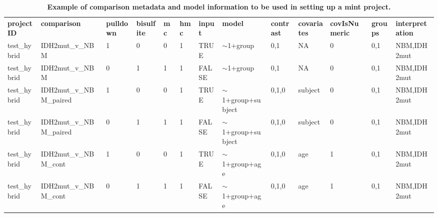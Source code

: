 \begin{sidewaystable}[!ht]
\centering
\tiny
\begin{tabular}{lllllllllllll}
\textbf{projectID} & \textbf{comparison}     & \textbf{pulldown} & \textbf{bisulfite} & \textbf{mc} & \textbf{hmc} & \textbf{input} & \textbf{model}        & \textbf{contrast} & \textbf{covariates} & \textbf{covIsNumeric} & \textbf{groups} & \textbf{interpretation} \\
test\_hybrid       & IDH2mut\_v\_NBM         & 1                 & 0                  & 0           & 1            & TRUE           & $\sim$1+group         & 0,1               & NA                  & 0                     & 0,1             & NBM,IDH2mut             \\
test\_hybrid       & IDH2mut\_v\_NBM         & 0                 & 1                  & 1           & 1            & FALSE          & $\sim$1+group         & 0,1               & NA                  & 0                     & 0,1             & NBM,IDH2mut             \\
test\_hybrid       & IDH2mut\_v\_NBM\_paired & 1                 & 0                  & 0           & 1            & TRUE           & $\sim$1+group+subject & 0,1,0             & subject             & 0                     & 0,1             & NBM,IDH2mut             \\
test\_hybrid       & IDH2mut\_v\_NBM\_paired & 0                 & 1                  & 1           & 1            & FALSE          & $\sim$1+group+subject & 0,1,0             & subject             & 0                     & 0,1             & NBM,IDH2mut             \\
test\_hybrid       & IDH2mut\_v\_NBM\_cont   & 1                 & 0                  & 0           & 1            & TRUE           & $\sim$1+group+age     & 0,1,0             & age                 & 1                     & 0,1             & NBM,IDH2mut             \\
test\_hybrid       & IDH2mut\_v\_NBM\_cont   & 0                 & 1                  & 1           & 1            & FALSE          & $\sim$1+group+age     & 0,1,0             & age                 & 1                     & 0,1             & NBM,IDH2mut
\end{tabular}
\normalsize
\caption[Example of comparison metadata and model information to be used in setting up a mint project.]
{
\textbf{Example of comparison metadata and model information to be used in setting up a mint project.}
}
\end{sidewaystable}
